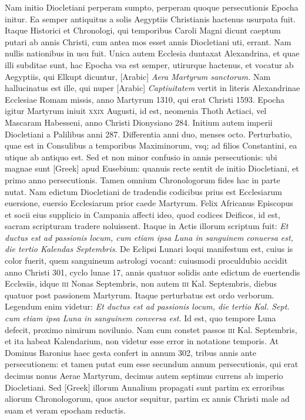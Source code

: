 Nam initio Diocletiani perperam sumpto, perperam quoque
persecutionis Epocha initur.
Ea semper antiquitus a solis Aegyptiis
Christianis hactenus usurpata fuit.
Itaque Historici et Chronologi,
qui temporibus Caroli Magni dicunt caeptum putari ab annis
Christi, cum antea mos esset annis Diocletiani uti, errant.
Nam
nullis nationibus in usu fuit.
Unica autem Ecclesia duntaxat Alexandrina,
et quae illi subditae sunt, hac Epocha vsa est semper, utirurque
hactenus, et vocatur ab Aegyptiis, qui Elkupt dicuntur,
\textarabic{[Arabic]} \textit{Aera Martyrum sanctorum.}
Nam
hallucinatus est ille, qui nuper \textarabic{[Arabic]}
\textit{Captiuitatem} vertit in literis
Alexandrinae Ecclesiae Romam missis, anno Martyrum 1310, qui
erat Christi 1593.
Epocha igitur Martyrum iniuit \textsc{xxix} Augusti,
id est, neomenia Thoth Actiaci, vel Mascaram Habesseni, anno Christi
Dionysiano 284.
Initium autem imperii Diocletiani a Palilibus
anni 287.
Differentia anni duo, menses octo.
Perturbatio, quae est in
Consulibus a temporibus Maximinorum, vsq; ad filios Constantini,
ea utique ab antiquo est.
Sed et non minor confusio in annis persecutionis:
ubi magnae sunt \textgreek{[Greek]} apud Eusebium: quanuis
recte sentit de initio Diocletiani, et primo anno persecutionis.
Tamen
omnium Chronologorum fides hac in parte nutat.
Nam edictum
Diocletiani de tradendis codicibus prius est Ecclesiarum euersione,
euersio Ecclesiarum prior caede Martyrum.
Felix Africanus Episcopus
et socii eius supplicio in Campania affecti ideo, quod codices
Deificos, id est, sacram scripturam tradere noluissent.
Itaque in
Actis illorum scriptum fuit: \textit{Et ductus est ad passionis locum, cum etiam
ipsa Luna in sanguinem conuersa est, die tertio Kalendas Septembris}.
De Eclipsi
Lunari loqui manifestum est, cuius is color fuerit, quem sanguineum
astrologi vocant: cuiusmodi proculdubio accidit anno Christi
301, cyclo lunae 17, annis quatuor solidis ante edictum de euertendis
Ecclesiis, idque \textsc{iii} Nonas Septembris, non autem \textsc{iii} Kal.
Septembris, diebus quatuor post passionem Martyrum.
Itaque perturbatus
est ordo verborum.
Legendum enim videtur: \textit{Et ductus est ad passionis
locum, die tertio Kal. Sept. cum etiam ipsa Luna in sanguinem conversa
est.}
Id est, quo tempore Luna defecit, proximo nimirum novilunio.
Nam cum constet passos \textsc{iii} Kal. Septembris, et ita habeat
Kalendarium, non videtur esse error in notatione temporis.
At Dominus Baronius haec gesta confert in annum 302, tribus annis ante
persecutionem: et tamen putat eum esse secundum annum persecutionis,
qui erat decimus nonus Aerae Martyrum, decimus autem
septimus currens ab imperio Diocletiani.
{}
Sed \textgreek{[Greek]} illorum
Annalium propagati sunt partim ex erroribus aliorum Chronologorum,
quos auctor sequitur, partim ex annis Christi male ad
suam et veram epocham reductis.

